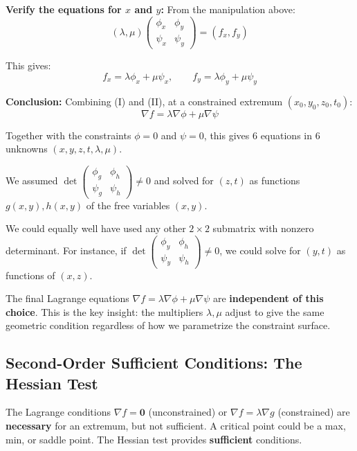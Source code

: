 \documentclass[11pt]{report}
\begin{document}
\textbf{Verify the equations for $x$ and $y$:} From the manipulation above:
\[
(\lambda, \mu) \begin{pmatrix} \phi_x & \phi_y \\ \psi_x & \psi_y \end{pmatrix} = (f_x, f_y)
\]

This gives:
\[
f_x = \lambda \phi_x + \mu \psi_x, \qquad f_y = \lambda \phi_y + \mu \psi_y \tag{II}
\]

\textbf{Conclusion:} Combining (I) and (II), at a constrained extremum $(x_0, y_0, z_0, t_0)$:
\[
\boxed{\nabla f = \lambda \nabla \phi + \mu \nabla \psi}
\]

Together with the constraints $\phi = 0$ and $\psi = 0$, this gives 6 equations in 6 unknowns $(x, y, z, t, \lambda, \mu)$.

\begin{remark}
We assumed $\det \begin{pmatrix} \phi_g & \phi_h \\ \psi_g & \psi_h \end{pmatrix} \neq 0$ and solved for $(z, t)$ as functions $g(x,y), h(x,y)$ of the free variables $(x, y)$.

We could equally well have used any other $2 \times 2$ submatrix with nonzero determinant. For instance, if $\det \begin{pmatrix} \phi_y & \phi_h \\ \psi_y & \psi_h \end{pmatrix} \neq 0$, we could solve for $(y, t)$ as functions of $(x, z)$.

The final Lagrange equations $\nabla f = \lambda \nabla \phi + \mu \nabla \psi$ are \textbf{independent of this choice}. This is the key insight: the multipliers $\lambda, \mu$ adjust to give the same geometric condition regardless of how we parametrize the constraint surface.
\end{remark}

\subsection{Second-Order Sufficient Conditions: The Hessian Test}

The Lagrange conditions $\nabla f = \mathbf{0}$ (unconstrained) or $\nabla f = \lambda \nabla g$ (constrained) are \textbf{necessary} for an extremum, but not sufficient. A critical point could be a max, min, or saddle point. The Hessian test provides \textbf{sufficient} conditions.
\end{document}
